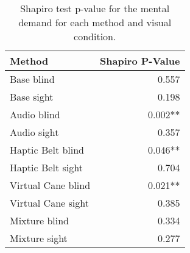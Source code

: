 
\begin{table}[!htb]
\centering
\caption{Shapiro test p-value for the mental demand for each method and visual condition.}
\label{tab:shapiro_mental_demand}
\begin{tabular}{lr}
\toprule
            Method & Shapiro P-Value \\
\midrule
        Base blind &           0.557 \\
        Base sight &           0.198 \\
       Audio blind &         0.002** \\
       Audio sight &           0.357 \\
 Haptic Belt blind &         0.046** \\
 Haptic Belt sight &           0.704 \\
Virtual Cane blind &         0.021** \\
Virtual Cane sight &           0.385 \\
     Mixture blind &           0.334 \\
     Mixture sight &           0.277 \\
\bottomrule
\end{tabular}
\end{table}

